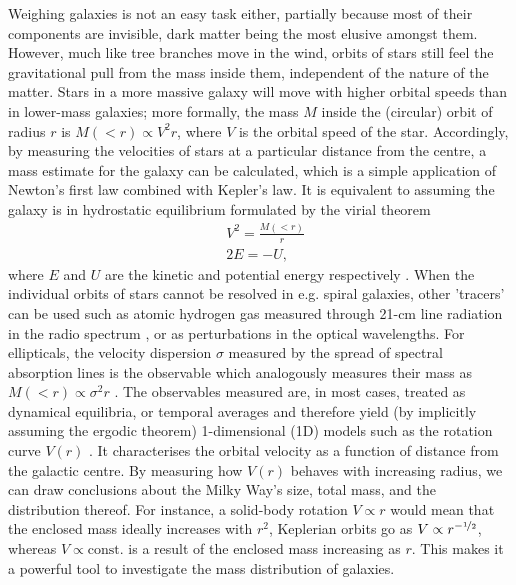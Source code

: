 Weighing galaxies is not an easy task either, partially because most of their
components are invisible, dark matter being the most elusive amongst them.
However, much like tree branches move in the wind, orbits of stars still feel
the gravitational pull from the mass inside them, independent of the nature of
the matter.  Stars in a more massive galaxy will move with higher orbital speeds
than in lower-mass galaxies; more formally, the mass $M$ inside the (circular)
orbit of radius $r$ is $M(<r) \propto V^{2}r$, where $V$ is the orbital speed of
the star.  Accordingly, by measuring the velocities of stars at a particular
distance from the centre, a mass estimate for the galaxy can be calculated,
which is a simple application of Newton's first law combined with Kepler's law.
It is equivalent to assuming the galaxy is in hydrostatic equilibrium formulated
by the virial theorem 
\begin{equation}
    \begin{aligned}
        &V^{2} = \frac{M(<r)}{r}\\
        &2E = -U,
    \end{aligned}
\end{equation}
where $E$ and $U$ are the kinetic and potential energy respectively
.  When the individual orbits of stars
cannot be resolved in {e.g.} spiral galaxies, other 'tracers' can be used such
as atomic hydrogen gas measured through 21-cm line radiation in the radio
spectrum , or as
perturbations in the optical wavelengths.  For ellipticals, the velocity
dispersion $\sigma$ measured by the spread of spectral absorption lines is the
observable which analogously measures their mass as $M(<r) \propto \sigma^{2}r$
.  The observables measured are, in most cases,
treated as dynamical equilibria, or temporal averages and therefore yield (by
implicitly assuming the ergodic theorem) 1-dimensional (1D) models such as the
rotation curve $V(r)$ .  It characterises
the orbital velocity as a function of distance from the galactic centre. By
measuring how $V(r)$ behaves with increasing radius, we can draw conclusions
about the Milky Way's size, total mass, and the distribution thereof.  For
instance, a solid-body rotation $V \propto r$ would mean that the enclosed mass
ideally increases with $r^{2}$, Keplerian orbits go as $V \propto r^{-\mathrm{\nicefrac{1}{2}}}$,
whereas $V \propto \text{const.}$ is a result of the enclosed mass increasing as
$r$.  This makes it a powerful tool to investigate the mass distribution of
galaxies.

